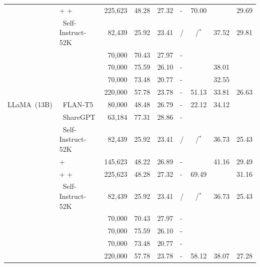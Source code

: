 \begin{table}[htb]
{\begin{tabular}{llrcH|Hccc}
 &  +  +  & 225,623 & 48.28 & 27.32 & - & 70.00 &  & 29.69\\
 & ~Self-Instruct-52K & 82,439 & 25.92 & 23.41 & / & /$^*$ & 37.52 & 29.81\\
 &  & 70,000 & 70.43 & 27.97 & - &   &  & \\
 &  & 70,000 & 75.59 & 26.10 & - &   & 38.01 & \\
 &  & 70,000 & 73.48 & 20.77 & - &   & 32.55 & \\
 &  & 220,000 & 57.78 & 23.78 & - & 51.13  & 33.81 & 26.63\\
 \midrule
LLaMA~(13B) & ~FLAN-T5 & 80,000 & 48.48 & 26.79 & - & 22.12 & 34.12 & \\
 & ~ShareGPT & 63,184 & 77.31 & 28.86 & - &  &  & \\
 & ~Self-Instruct-52K & 82,439 & 25.92 & 23.41 & / & /$^*$ & 36.73 & 25.43 \\
 &  +  & 145,623 & 48.22 & 26.89 & - &  & 41.16 & 29.49\\
 &  +  +  & 225,623 & 48.28 & 27.32 & - & 69.49 &  & 31.16\\
 & ~Self-Instruct-52K & 82,439 & 25.92 & 23.41 & / & /$^*$ & 36.73 & 25.43\\
 &  & 70,000 & 70.43 & 27.97 & - &  &  & \\
 &  & 70,000 & 75.59 & 26.10 & - &  &  & \\
 &  & 70,000 & 73.48 & 20.77 & - &  &  & \\
 &  & 220,000 & 57.78 & 23.78 & - & 58.12 & 38.07 & 27.28\\
\bottomrule
\end{tabular}
}
\end{table}






